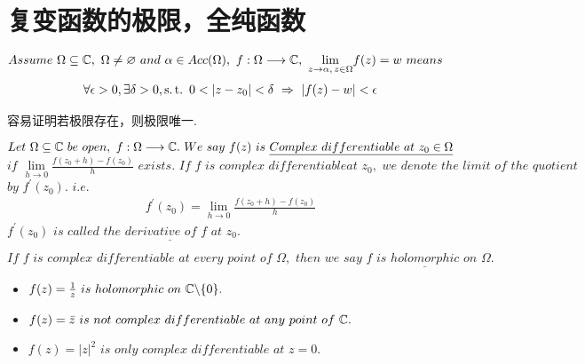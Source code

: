 \section{复变函数的极限，全纯函数}
\begin{defn}\label{def 2.2.1}
	$Assume \,\, \Omega \subseteq \mathbb{C} , \,\, \Omega \neq \varnothing \,\, and \,\, \alpha \in Acc(\Omega) , \,\, f : \Omega \longrightarrow \mathbb{C} , \,\, \underset{z \to \alpha , \, z \in \Omega}{\lim}{f(z)} = w \,\, means$
	\begin{align}
		\forall \epsilon > 0 , \exists \delta > 0 , \operatorname{s.t.} \,\, 0 < \left| z - z_0 \right| < \delta \,\, \Rightarrow \,\, \left| f(z) - w \right| < \epsilon
	\end{align}
	
	\begin{rmk}
		容易证明若极限存在，则极限唯一.
	\end{rmk}
\end{defn}

\vspace*{2em}
\begin{defn}\label{def 2.2.2}
	$Let \,\, \Omega \subseteq \mathbb{C} \,\, be \,\, open , \,\, f : \Omega \longrightarrow \mathbb{C} . \,\, We \,\, say \,\, f(z) \,\, is \,\, \underline{\textbf{$Complex \,\, differentiable \,\, at \,\, z_0 \in \Omega$}}$\\
	$if \,\, \underset{h \to 0}{\lim}{\frac{f(z_0 + h) - f(z_0)}{h}} \,\, exists. \,\, If \,\, f \,\, is \,\, complex \,\, differentiable at \,\, z_0 , \,\, we \,\, denote \,\, the \,\, limit \,\, of \,\, the \,\, quotient $\\ 
	$by \,\, f^{'}(z_0) . \,\, i.e.$
	\begin{align}
		f^{'}(z_0) = \lim_{h \to 0}{\frac{f(z_0 + h) - f(z_0)}{h}}
	\end{align}
	$f^{'}(z_0) \,\, is \,\, called \,\, \underline{\textbf{$the \,\, derivative \,\, of \,\, f \,\, at \,\, z_0$}}$.
	
	\begin{rmk}
		$If \,\, f \,\, is \,\, complex \,\, differentiable \,\, at \,\, every \,\, point \,\, of \,\, \Omega , \,\, then \,\, we \,\, say \,\, f \,\, is \,\, \underline{\textbf{$holomorphic$}} \,\, on \,\,  \Omega.$
	\end{rmk}
\end{defn}

\vspace*{2em}
\begin{example}\label{ex 2.2.1}
	\begin{itemize}
		\item $f(z) = \frac{1}{z} \,\, is \,\, holomorphic \,\, on \,\, \mathbb{C} \backslash \{ 0 \}.$
		
		\item $f(z) = \bar{z} \,\, is \,\, not \,\, complex \,\, differentiable \,\, at \,\, any \,\, point \,\, of \,\, \mathbb{C}.$
		
		\item $f(z) = \left| z \right|^2 \,\, is \,\, only \,\, complex \,\, differentiable \,\, at \,\, z = 0.$
	\end{itemize}
\end{example}

